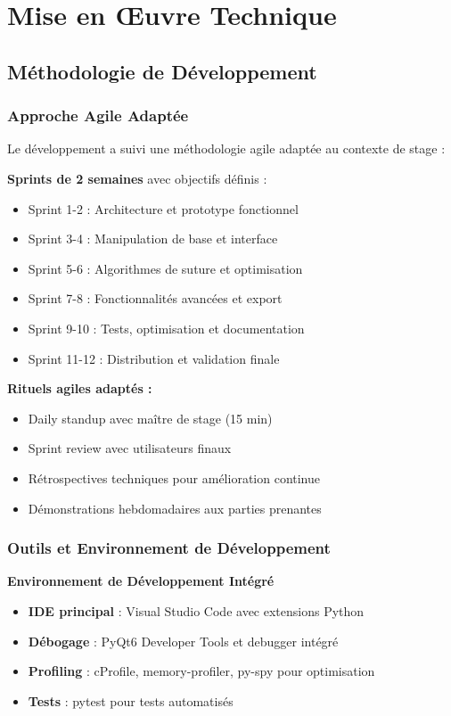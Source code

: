 \documentclass[12pt,a4paper]{report}
\begin{document}
\section{Mise en Œuvre Technique}

\subsection{Méthodologie de Développement}

\subsubsection{Approche Agile Adaptée}

Le développement a suivi une méthodologie agile adaptée au contexte de stage :

\textbf{Sprints de 2 semaines} avec objectifs définis :
\begin{itemize}
\item Sprint 1-2 : Architecture et prototype fonctionnel
\item Sprint 3-4 : Manipulation de base et interface
\item Sprint 5-6 : Algorithmes de suture et optimisation
\item Sprint 7-8 : Fonctionnalités avancées et export
\item Sprint 9-10 : Tests, optimisation et documentation
\item Sprint 11-12 : Distribution et validation finale
\end{itemize}

\textbf{Rituels agiles adaptés :}
\begin{itemize}
\item Daily standup avec maître de stage (15 min)
\item Sprint review avec utilisateurs finaux
\item Rétrospectives techniques pour amélioration continue
\item Démonstrations hebdomadaires aux parties prenantes
\end{itemize}

\subsubsection{Outils et Environnement de Développement}

\textbf{Environnement de Développement Intégré}
\begin{itemize}
\item \textbf{IDE principal} : Visual Studio Code avec extensions Python
\item \textbf{Débogage} : PyQt6 Developer Tools et debugger intégré
\item \textbf{Profiling} : cProfile, memory-profiler, py-spy pour optimisation
\item \textbf{Tests} : pytest pour tests automatisés
\end{itemize}
\end{document}
